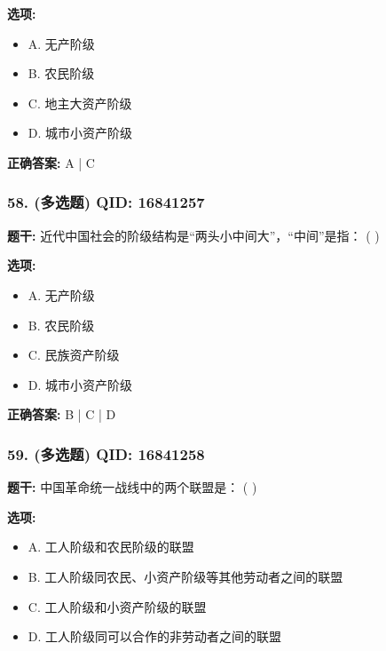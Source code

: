 \documentclass[12pt,UTF8]{ctexart}
\begin{document}
\textbf{选项:}
\begin{itemize}[leftmargin=*]

  \item A. 无产阶级

  \item B. 农民阶级

  \item C. 地主大资产阶级

  \item D. 城市小资产阶级

\end{itemize}

\textbf{正确答案:}
A | C

\vspace{0.3em}\hrulefill\vspace{0.7em}

\subsubsection*{58. (多选题) \small QID: 16841257}

\textbf{题干:}
近代中国社会的阶级结构是“两头小中间大”，“中间”是指： ( )

\textbf{选项:}
\begin{itemize}[leftmargin=*]

  \item A. 无产阶级

  \item B. 农民阶级

  \item C. 民族资产阶级

  \item D. 城市小资产阶级

\end{itemize}

\textbf{正确答案:}
B | C | D

\vspace{0.3em}\hrulefill\vspace{0.7em}

\subsubsection*{59. (多选题) \small QID: 16841258}

\textbf{题干:}
中国革命统一战线中的两个联盟是： ( )

\textbf{选项:}
\begin{itemize}[leftmargin=*]

  \item A. 工人阶级和农民阶级的联盟

  \item B. 工人阶级同农民、小资产阶级等其他劳动者之间的联盟

  \item C. 工人阶级和小资产阶级的联盟

  \item D. 工人阶级同可以合作的非劳动者之间的联盟

\end{itemize}
\end{document}
